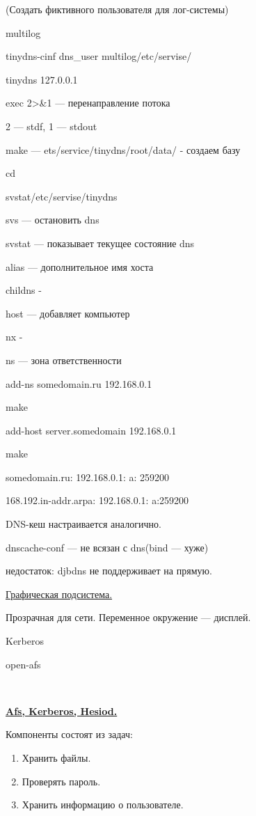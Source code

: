 \par 
(Создать фиктивного пользователя для
лог-системы) 

\par 
multilog
\par 
tinydns-cinf dns\_user multilog/etc/servise/
\par 
tinydns 127.0.0.1
\par 
exec 2>\&1 — перенаправление потока
\par 
2 — stdf, 1 — stdout
\par 
make — ets/service/tinydns/root/data/ - создаем базу
\par 
cd
\par 
svstat/etc/servise/tinydns
\par 
svs — остановить dns
\par 
svstat — показывает текущее состояние dns
\par 
alias — дополнительное имя хоста
\par 
childns -
\par 
host — добавляет компьютер
\par 
nx -
\par 
ns — зона ответственности
\par 
add-ns somedomain.ru 192.168.0.1 

\par 
make
\par 
add-host server.somedomain 192.168.0.1 

\par 
make
\par 
somedomain.ru: 192.168.0.1: a: 259200
\par 
168.192.in-addr.arpa: 192.168.0.1: a:259200
\par 
DNS-кеш настраивается аналогично.
\par 
dnscache-conf — не всязан с dns(bind — хуже)
\par 
недостаток: djbdns не поддерживает на
прямую.
\par 
\underline{Графическая подсистема.}
\par 
Прозрачная для сети. Переменное окружение
— дисплей.
\par 
Kerberos
\par 
open-afs
\par 
\\

\par 
\underline{\textbf{Afs, Kerberos, Hesiod.}}
\par 
Компоненты состоят из задач:
\begin{enumerate}
	\item \par 
	Хранить файлы.
	\item \par 
	Проверять пароль.
	\item \par 
	Хранить информацию о пользователе.
\end{enumerate}
\par 
 

